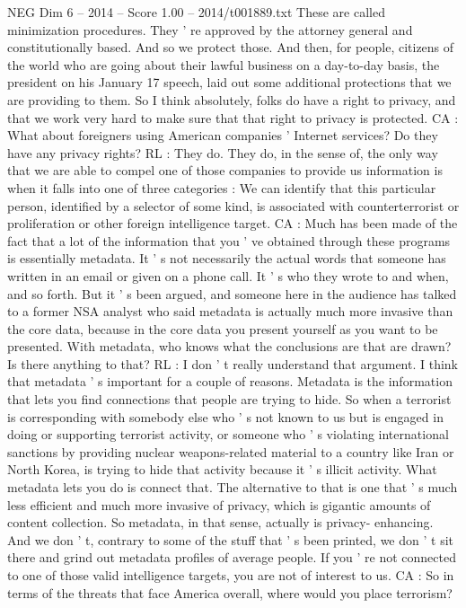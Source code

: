 \begin{textsample}{NEG Dim 6 – 2014 – Score 1.00 – 2014/t001889.txt}
These are called minimization procedures.
They ' re approved by the attorney general and constitutionally based.
And so we protect those.
And then, for people, citizens of the world who are going about their lawful business on a day-to-day basis, the president on his January 17 speech, laid out some additional protections that we are providing to them.
So I think absolutely, folks do have a right to privacy, and that we work very hard to make sure that that right to privacy is protected.
CA : What about foreigners using American companies ' Internet services?
Do they have any privacy rights?
RL : They do.
They do, in the sense of, the only way that we are able to compel one of those companies to provide us information is when it falls into one of three categories : We can identify that this particular person, identified by a selector of some kind, is associated with counterterrorist or proliferation or other foreign intelligence target.
CA : Much has been made of the fact that a lot of the information that you ' ve obtained through these programs is essentially metadata.
It ' s not necessarily the actual words that someone has written in an email or given on a phone call.
It ' s who they wrote to and when, and so forth.
But it ' s been argued, and someone here in the audience has talked to a former NSA analyst who said metadata is actually much more invasive than the core data, because in the core data you present yourself as you want to be presented.
With metadata, who knows what the conclusions are that are drawn?
Is there anything to that?
RL : I don ' t really understand that argument.
I think that metadata ' s important for a couple of reasons.
Metadata is the information that lets you find connections that people are trying to hide.
So when a terrorist is corresponding with somebody else who ' s not known to us but is engaged in doing or supporting terrorist activity, or someone who ' s violating international sanctions by providing nuclear weapons-related material to a country like Iran or North Korea, is trying to hide that activity because it ' s illicit activity.
What metadata lets you do is connect that.
The alternative to that is one that ' s much less efficient and much more invasive of privacy, which is gigantic amounts of content collection.
So metadata, in that sense, actually is privacy- enhancing.
And we don ' t, contrary to some of the stuff that ' s been printed, we don ' t sit there and grind out metadata profiles of average people.
If you ' re not connected to one of those valid intelligence targets, you are not of interest to us.
CA : So in terms of the threats that face America overall, where would you place terrorism?

\end{textsample}

